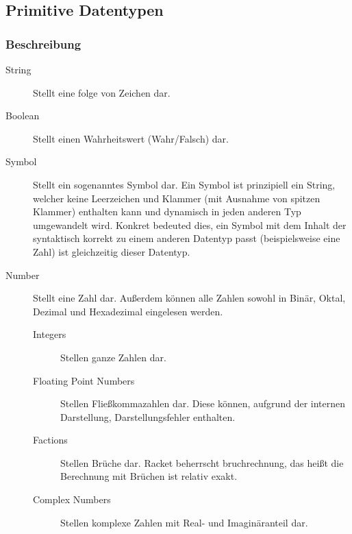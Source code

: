 \documentclass[a4paper, 11pt, accentcolor = tud3b]{tudreport}
\begin{document}
        \subsection{Primitive Datentypen}
            \subsubsection{Beschreibung}
                \begin{description}
                    \item[String] Stellt eine folge von Zeichen dar.
                    \item[Boolean] Stellt einen Wahrheitswert (Wahr/Falsch) dar.
                    \item[Symbol] Stellt ein sogenanntes Symbol dar. Ein Symbol ist prinzipiell ein String, welcher keine Leerzeichen und Klammer (mit Ausnahme von spitzen Klammer) enthalten kann und dynamisch in jeden anderen Typ umgewandelt wird. Konkret bedeuted dies, ein Symbol mit dem Inhalt der syntaktisch korrekt zu einem anderen Datentyp passt (beispielsweise eine Zahl) ist gleichzeitig dieser Datentyp.
                    \item[Number] Stellt eine Zahl dar. Außerdem können alle Zahlen sowohl in Binär, Oktal, Dezimal und Hexadezimal eingelesen werden.
                        \begin{description}
                            \item[Integers] Stellen ganze Zahlen dar.
                            \item[Floating Point Numbers] Stellen Fließkommazahlen dar. Diese können, aufgrund der internen Darstellung, Darstellungsfehler enthalten.
                            \item[Factions] Stellen Brüche dar. Racket beherrscht bruchrechnung, das heißt die Berechnung mit Brüchen ist relativ exakt.
                            \item[Complex Numbers] Stellen komplexe Zahlen mit Real- und Imaginäranteil dar.
                        \end{description}
                \end{description}
\end{document}

